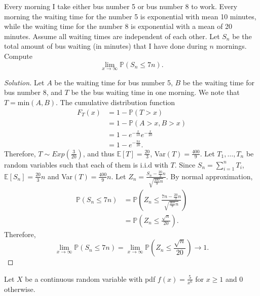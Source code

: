 \documentclass[addpoints, 11pt]{exam}
\newcommand*{\prob}{\mathds{P}}
\newcommand*{\E}{\mathds{E}}
\newenvironment{question}[1]{\smallskip\noindent\color{crimson}{\bf Question #1.}}{}
\begin{document}
\newpage

\begin{question}{6}
    Every morning I take either bus number 5 or bus number 8 to work. Every morning the waiting time for the number 5 is exponential with mean 10 minutes, while the waiting time for the number 8 is exponential with a mean of 20 minutes. Assume all waiting times are independent of each other. Let $S_n$ be the total amount of bus waiting (in minutes) that I have done during $n$ mornings. Compute
    \[
        \lim_{x\to\infty} \prob(S_n \leq 7n).
    \]
\end{question}

\begin{proof}[Solution]
    Let $A$ be the waiting time for bus number 5, $B$ be the waiting time for bus number 8, and $T$ be the bus waiting time in one morning. We note that $T = \text{min}(A, B)$. The cumulative distribution function 
    \begin{align*}
        F_T(x) 
        &= 1 - \prob(T > x) \\
        &= 1 - \prob(A > x, B > x) \\
        &= 1 - e^{-\frac{x}{10}}e^{-\frac{x}{20}} \\
        &= 1 - e^{-\frac{3x}{20}}.
    \end{align*}
    Therefore, $T \sim Exp(\frac{3}{20})$, and thus $\E[T] = \frac{20}{3}$, Var$(T) = \frac{400}{9}$. Let $T_1, \dots, T_n$ be random variables such that each of them is i.i.d with $T$. Since $S_n = \sum_{i = 1}^n T_i$, $\E[S_n] = \frac{20}{3}n$ and Var$(T) = \frac{400}{9}n$. Let $Z_n = \frac{S_n - \frac{20}{3}n}{\sqrt{\frac{400}{9}n}}$. By normal approximation,
    \begin{align*}
        \prob(S_n \leq 7n)
        &= \prob\left(Z_n \leq \frac{7n - \frac{20}{3}n}{\sqrt{\frac{400}{9}n}}\right) \\
        &= \prob\left(Z_n \leq \frac{\sqrt{n}}{20}\right).
    \end{align*}
    Therefore, \[
        \lim_{x\to\infty} \prob(S_n \leq 7n) = \lim_{x\to\infty} \prob\left(Z_n \leq \frac{\sqrt{n}}{20}\right) \rightarrow 1.
    \]
\end{proof}

\newpage

\begin{question}{7}
    Let $X$ be a continuous random variable with pdf $f(x) = \frac{5}{x^6}$ for $x \geq 1$ and 0 otherwise.
\end{question}
\end{document}
